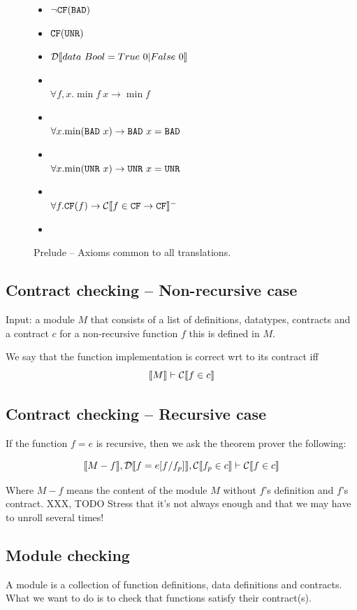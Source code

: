 \documentclass[preprint]{sigplanconf}
\begin{document}
\begin{figure}\label{fig:prelude}
  \begin{itemize}
    \item $\lnot \texttt{CF}(\texttt{BAD})$
    \item $\texttt{CF}(\texttt{UNR})$
    \item $\mathcal{D} \llbracket data~Bool = True~0 | False~0 \rrbracket$
    \item \designChoice\\ $\forall f,x. \min{f ~x} \to \min{f}$
    \item \designChoice\\ $\forall x. \mbox{min}(\texttt{BAD} ~x) \to \texttt{BAD} ~x = \texttt{BAD}$ 
    \item \designChoice\\ $\forall x. \mbox{min}(\texttt{UNR} ~x) \to \texttt{UNR} ~x = \texttt{UNR}$
    \item \designChoice\\ $\forall f. \texttt{CF}(f) \to \mathcal{C} \llbracket f \in \texttt{CF} \to \texttt{CF} \rrbracket^-$
    \item 
  \end{itemize}
  \caption{Prelude -- Axioms common to all translations.}
\end{figure}

\subsection{Contract checking -- Non-recursive case}
Input: a module $M$ that consists of a list of definitions, datatypes,
contracts and a contract $c$ for a non-recursive function $f$ this is
defined in $M$.

We say that the function implementation is correct wrt to its contract
iff $$\llbracket M \rrbracket \vdash \mathcal{C} \llbracket f \in c \rrbracket$$

\subsection{Contract checking -- Recursive case}\label{sec:recursiveContracts}
If the function $f=e$ is recursive, then we ask the theorem prover the
following:

$$\llbracket M - f \rrbracket, \mathcal{D} \llbracket f=e[f/f_p] \rrbracket, \mathcal{C} \llbracket f_p \in c \rrbracket \vdash \mathcal{C} \llbracket f \in c \rrbracket$$

Where $M - f $ means the content of the module $M$ without $f$'s
definition and $f$'s contract. XXX, TODO Stress that it's not always enough
and that we may have to unroll several times!

\subsection{Module checking}
A module is a collection of function definitions, data definitions and
contracts. What we want to do is to check that functions satisfy their
contract(s). 
\end{document}
